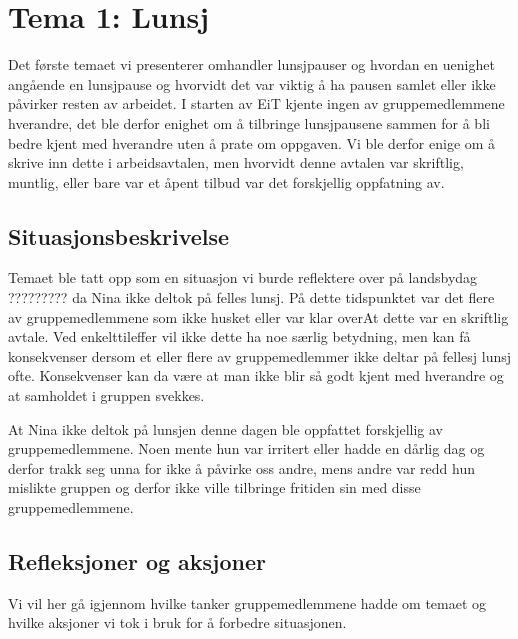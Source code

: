 \chapter{Tema 1: Lunsj}
Det første temaet vi presenterer omhandler lunsjpauser og hvordan en uenighet angående en lunsjpause og hvorvidt det var viktig å ha pausen samlet eller ikke påvirker resten av arbeidet. I starten av EiT kjente ingen av gruppemedlemmene hverandre, det ble derfor enighet om å tilbringe lunsjpausene sammen for å bli bedre kjent med hverandre uten å prate om oppgaven. Vi ble derfor enige om å skrive inn dette i arbeidsavtalen, men hvorvidt denne avtalen var skriftlig, muntlig, eller bare var et åpent tilbud var det forskjellig oppfatning av.

\section{Situasjonsbeskrivelse}
Temaet ble tatt opp som en situasjon vi burde reflektere over på landsbydag ????????? da Nina ikke deltok på felles lunsj. På dette tidspunktet var det flere av gruppemedlemmene som ikke husket eller var klar overAt dette var en skriftlig avtale. Ved enkelttileffer vil ikke dette ha noe særlig betydning, men kan få konsekvenser dersom et eller flere av gruppemedlemmer ikke deltar på fellesj lunsj ofte. Konsekvenser kan da være at man ikke blir så godt kjent med hverandre og at samholdet i gruppen svekkes. 

At Nina ikke deltok på lunsjen denne dagen ble oppfattet forskjellig av gruppemedlemmene. Noen mente hun var irritert eller hadde en dårlig dag og derfor trakk seg unna for ikke å påvirke oss andre, mens andre var redd hun mislikte gruppen og derfor ikke ville tilbringe fritiden sin med disse gruppemedlemmene. 



\section{Refleksjoner og aksjoner}
Vi vil her gå igjennom hvilke tanker gruppemedlemmene hadde om temaet og hvilke aksjoner vi tok i bruk for å forbedre situasjonen.

